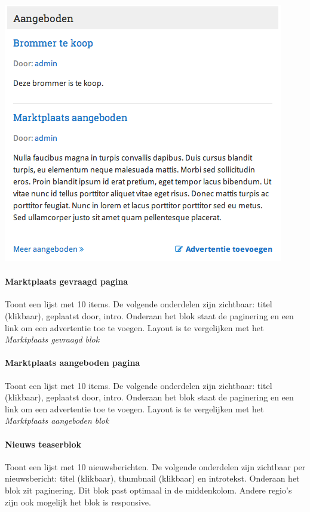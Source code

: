 \begin{center}
	\includegraphics[scale=0.5]{img/blokken/marktplaatsaangeboden.png}
\end{center}

\paragraph{Marktplaats gevraagd pagina}

Toont een lijst met 10 items. De volgende onderdelen zijn zichtbaar: titel (klikbaar), geplaatst door, intro. Onderaan het blok staat de paginering en een link om een advertentie toe te voegen. Layout is te vergelijken met het \emph{Marktplaats gevraagd blok}

\paragraph{Marktplaats aangeboden pagina}

Toont een lijst met 10 items. De volgende onderdelen zijn zichtbaar: titel (klikbaar), geplaatst door, intro. Onderaan het blok staat de paginering en een link om een advertentie toe te voegen. Layout is te vergelijken met het \emph{Marktplaats aangeboden blok}

\paragraph{Nieuws teaserblok}

Toont een lijst met 10 nieuwsberichten. De volgende onderdelen zijn zichtbaar per nieuwsbericht: titel (klikbaar), thumbnail (klikbaar) en introtekst. Onderaan het blok zit paginering. Dit blok past optimaal in de middenkolom. Andere regio's zijn ook mogelijk het blok is responsive.

